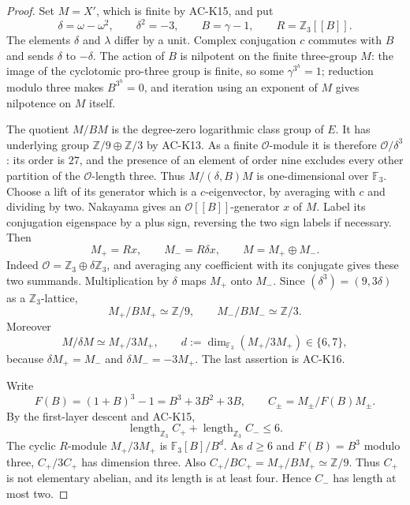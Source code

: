 \begin{proof}
Set $M=X'$, which is finite by AC-K15, and put
\[
 \delta=\omega-\omega^2,\qquad \delta^2=-3,
 \qquad B=\gamma-1,\qquad R=\mathbb Z_3[[B]].
\]
The elements $\delta$ and $\lambda$ differ by a unit.
Complex conjugation $c$ commutes with $B$ and sends
$\delta$ to $-\delta$.  The action of $B$ is nilpotent
on the finite three-group $M$: the image of the cyclotomic
pro-three group is finite, so some $\gamma^{3^h}=1$;
reduction modulo three makes $B^{3^h}=0$, and iteration
using an exponent of $M$ gives nilpotence on $M$ itself.

The quotient $M/BM$ is the degree-zero logarithmic class
group of $E$.  It has underlying group
$\mathbb Z/9\oplus\mathbb Z/3$ by AC-K13.
As a finite $\mathcal O$-module it is therefore
$\mathcal O/\delta^3$: its order is $27$, and the presence
of an element of order nine excludes every other partition
of the $\mathcal O$-length three.
Thus $M/(\delta,B)M$ is one-dimensional over $\mathbb F_3$.
Choose a lift of its generator which is a $c$-eigenvector,
by averaging with $c$ and dividing by two.  Nakayama gives
an $\mathcal O[[B]]$-generator $x$ of $M$.
Label its conjugation eigenspace by a plus sign, reversing
the two sign labels if necessary.  Then
\[
 M_+=Rx,\qquad M_-=R\delta x,\qquad M=M_+\oplus M_-.
                                                               \tag{KE.5}
\]
Indeed $\mathcal O=\mathbb Z_3\oplus\delta\mathbb Z_3$,
and averaging any coefficient with its conjugate gives
these two summands.  Multiplication by $\delta$ maps
$M_+$ onto $M_-$.
Since $(\delta^3)=(9,3\delta)$ as a $\mathbb Z_3$-lattice,
\[
             M_+/BM_+\simeq\mathbb Z/9,
       \qquad M_-/BM_-\simeq\mathbb Z/3.              \tag{KE.6}
\]
Moreover
\[
 M/\delta M\simeq M_+/3M_+,
 \qquad d:=\dim_{\mathbb F_3}(M_+/3M_+)\in\{6,7\},  \tag{KE.7}
\]
because $\delta M_+=M_-$ and
$\delta M_-=-3M_+$.  The last assertion is AC-K16.

Write
\[
 F(B)=(1+B)^3-1=B^3+3B^2+3B,
 \qquad C_\pm=M_\pm/F(B)M_\pm.
\]
By the first-layer descent and AC-K15,
\[
       \operatorname{length}_{\mathbb Z_3}C_+
       +\operatorname{length}_{\mathbb Z_3}C_-
                                    \leq6.           \tag{KE.8}
\]
The cyclic $R$-module $M_+/3M_+$ is
$\mathbb F_3[B]/B^d$.  As $d\geq6$ and $F(B)=B^3$
modulo three, $C_+/3C_+$ has dimension three.
Also $C_+/BC_+=M_+/BM_+\simeq\mathbb Z/9$.
Thus $C_+$ is not elementary abelian, and its length is
at least four.  Hence $C_-$ has length at most two.


\end{proof}
